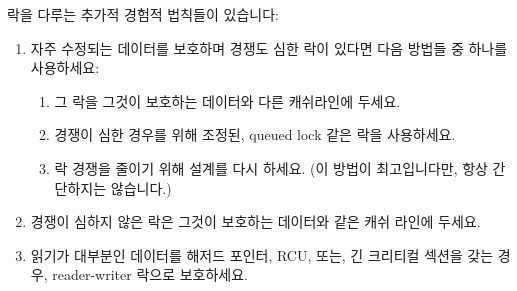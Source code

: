 락을 다루는 추가적 경험적 법칙들이 있습니다:

\begin{enumerate}
\item	자주 수정되는 데이터를 보호하며 경쟁도 심한 락이 있다면 다음 방법들 중
	하나를 사용하세요:
	\begin{enumerate}
	\item	그 락을 그것이 보호하는 데이터와 다른 캐쉬라인에 두세요.
	\item	경쟁이 심한 경우를 위해 조정된, queued lock 같은 락을
		사용하세요.
	\item	락 경쟁을 줄이기 위해 설계를 다시 하세요.
		(이 방법이 최고입니다만, 항상 간단하지는 않습니다.)
	\end{enumerate}
\item	경쟁이 심하지 않은 락은 그것이 보호하는 데이터와 같은 캐쉬 라인에
	두세요.
\item	읽기가 대부분인 데이터를 해저드 포인터, RCU, 또는, 긴 크리티컬 섹션을
	갖는 경우, reader-writer 락으로 보호하세요.

\end{enumerate}

